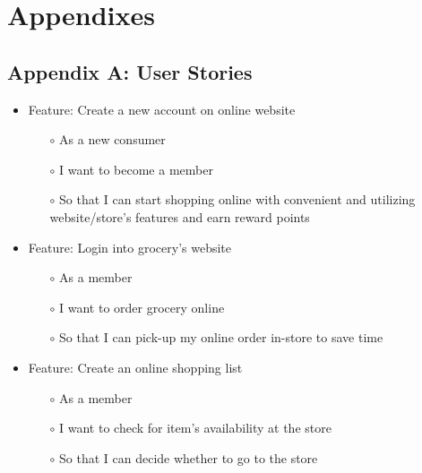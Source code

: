 \documentclass{scrreprt}
\begin{document}



\chapter{Appendixes}


\section{Appendix A: User Stories}
\begin{itemize}
	\item Feature: Create a new account on online website
	\begin{itemize}
		\item[$\circ$]As a new consumer
		\item[$\circ$]I want to become a member
		\item[$\circ$]So that I can start shopping online with convenient and utilizing website/store’s features and earn reward points
	\end{itemize}
\end{itemize}

\begin{itemize}
	\item Feature: Login into grocery’s website
	\begin{itemize}
		\item[$\circ$]As a member
		\item[$\circ$]I want to order grocery online
		\item[$\circ$]So that I can pick-up my online order in-store to save time
	\end{itemize}
\end{itemize}

\begin{itemize}
	\item Feature: Create an online shopping list
	\begin{itemize}
		\item[$\circ$]As a member
		\item[$\circ$]I want to check for item’s availability at the store
		\item[$\circ$]So that I can decide whether to go to the store
	\end{itemize}
\end{itemize}
\end{document}
